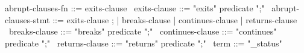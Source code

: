 \begin{syntax}
  abrupt-clauses-fn ::= exits-clause
  \
  exits-clause ::= {"exits" predicate ";"}
  \
  abrupt-clauses-stmt ::= exits-clause ;
        | breaks-clause | continues-clause | returns-clause
  \
  breaks-clause ::= {"breaks" predicate ";"}
  \
  continues-clause ::= {"continues" predicate ";"}
  \
  returns-clause ::= {"returns" predicate ";"}
  \
  term  ::= {"\exit_status"}
\end{syntax}